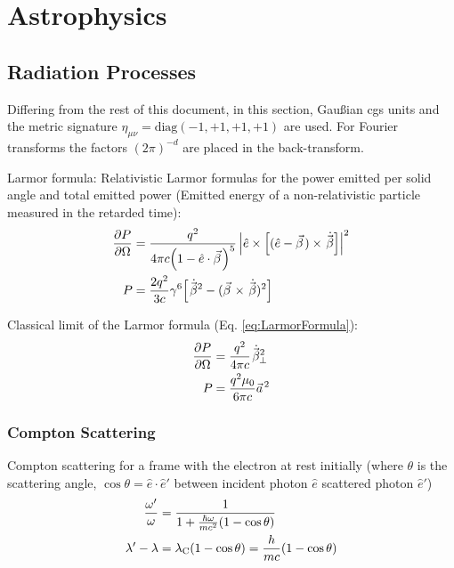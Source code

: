 \section{Astrophysics}
	\subsection{Radiation Processes}
		Differing from the rest of this document, in this section, Gaußian cgs units and the metric signature $\eta_{\mu\nu}=\mathrm{diag}(-1,+1,+1,+1)$ are used. For Fourier transforms the factors $(2\pi)^{-d}$ are placed in the back-transform.

		\noindent
		Larmor formula:
		Relativistic Larmor formulas for the power emitted per solid angle and total emitted power (Emitted energy of a non-relativistic particle measured in the retarded time):
		\begin{equation}
			\label{eq:LarmorFormula}
			\begin{aligned}
				\pdv{P}{\Omega} &= \frac{q^2}{4\pi c\qty(1-\hat{e}\cdot\vec{\beta})^5} \left| \hat{e}\times\qty[(\hat{e}-\vec{\beta}) \times \dot{\vec{\beta}}] \right|^2 \\
				P &= \frac{2q^2}{3c}\gamma^6\qty[\dot{\vec{\beta}}^2 - (\vec{\beta}\times\dot{\vec{\beta}})^2] \\
			\end{aligned}
		\end{equation}

		\noindent
		Classical limit of the Larmor formula (Eq. \ref{eq:LarmorFormula}):
		\begin{equation}
			\begin{aligned}
				\pdv{P}{\Omega} &= \frac{q^2}{4\pi c}\dot{\vec{\beta}}_\perp^2 \\
				P &= \frac{q^2 \mu_0}{6\pi c}\vec{a}^2\\
			\end{aligned}
		\end{equation}

		\subsubsection{Compton Scattering}
			Compton scattering for a frame with the electron at rest initially (where $\theta$ is the scattering angle, $\cos\theta = \hat{e}\cdot\hat{e}'$ between incident photon $\hat{e}$ scattered photon $\hat{e}'$)
			\begin{equation}
				\begin{aligned}
					\frac{\omega'}{\omega} &= \frac{1}{1+\frac{\hbar\omega}{mc^2}\qty(1-\cos\theta)} \\
					\lambda' - \lambda &= \lambda_\mathrm{C}(1-\cos\theta) = \frac{h}{m c}(1-\cos\theta)
				\end{aligned}
			\end{equation}

